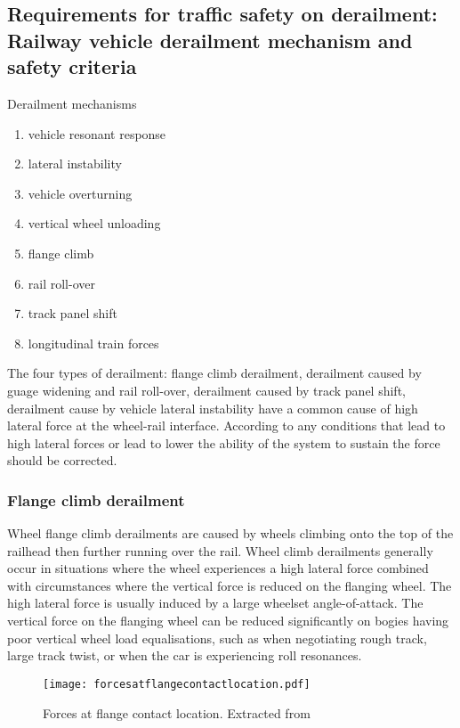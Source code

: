 \subsection{Requirements for traffic safety on derailment: Railway vehicle derailment mechanism and safety criteria}

Derailment mechanisms
\begin{enumerate}
    \item vehicle resonant response
    \item lateral instability
    \item vehicle overturning
    \item vertical wheel unloading
    \item flange climb
    \item rail roll-over
    \item track panel shift
    \item longitudinal train forces
\end{enumerate}

The four types of derailment: flange climb derailment, derailment caused by guage widening and rail roll-over, derailment caused by track panel shift, derailment cause by vehicle lateral instability have a common cause of high lateral force at the wheel-rail interface. According to \cite[Chapter 8, IV]{iwnicki2006handbook} any conditions that lead to high lateral forces or lead to lower the ability of the system to sustain the force should be corrected. 

\subsubsection{Flange climb derailment}
Wheel flange climb derailments are caused by wheels climbing onto the top of the railhead then further running over the rail. Wheel climb derailments generally occur in situations where the wheel experiences a high lateral force combined with circumstances where the vertical force is reduced on the flanging wheel. The high lateral force is usually induced by a large wheelset angle-of-attack. The vertical force on the flanging wheel can be reduced significantly on bogies having poor vertical wheel load equalisations, such as when negotiating rough track, large track twist, or when the car is experiencing roll resonances. 

\begin{figure}[h]
    \centering
    \texttt{[image: forcesatflangecontactlocation.pdf]}
    \caption{Forces at flange contact location. Extracted from \cite[Figure8.4]{iwnicki2006handbook}}
    \label{fig:forcesatflangecontactlocation}
\end{figure}

